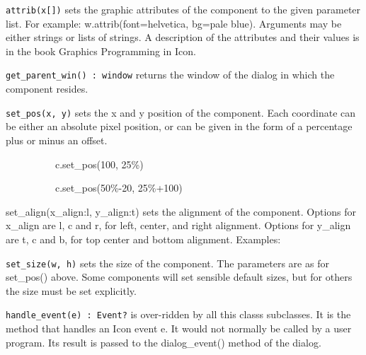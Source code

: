 \texttt{attrib(x[])} sets the graphic attributes of the component to the given
parameter list. For example:
w.attrib({\textquotedbl}font=helvetica{\textquotedbl},
{\textquotedbl}bg=pale blue{\textquotedbl}). Arguments may be either
strings or lists of strings. A description of the attributes and their
values is in the book {\textquotedbl}Graphics Programming in
Icon{\textquotedbl}.

\texttt{get\_parent\_win() : window} returns the window of the dialog in which
the component resides.

\texttt{set\_pos(x, y)} sets the x and y position of the component. Each
coordinate can be either an absolute pixel position, or can be given in
the form of a percentage plus or minus an offset.

{\ttfamily
\ \ \ \ \ \ \ \ \ \ c.set\_pos(100, {\textquotedbl}25\%{\textquotedbl})}

{\ttfamily
\ \ \ \ \ \ \ \ \ \ c.set\_pos({\textquotedbl}50\%-20{\textquotedbl},
{\textquotedbl}25\%+100{\textquotedbl})}

set\_align(x\_align:{\textquotedbl}l{\textquotedbl},
y\_align:{\textquotedbl}t{\textquotedbl}) sets the alignment of the
component. Options for x\_align are {\textquotedbl}l{\textquotedbl},
{\textquotedbl}c{\textquotedbl} and {\textquotedbl}r{\textquotedbl},
for left, center, and right alignment. Options for y\_align are
{\textquotedbl}t{\textquotedbl}, {\textquotedbl}c{\textquotedbl} and
{\textquotedbl}b{\textquotedbl}, for top center and bottom alignment.
Examples:


\texttt{set\_size(w, h)} sets the size of the component. The parameters are as
for set\_pos() above. Some components will set sensible default sizes,
but for others the size must be set explicitly.

\texttt{handle\_event(e) : Event?} is over-ridden by all this
class{\textquotesingle}s subclasses. It is the method that handles an
Icon event e. It would not normally be called by a user program. Its
result is passed to the dialog\_event() method of the dialog.

